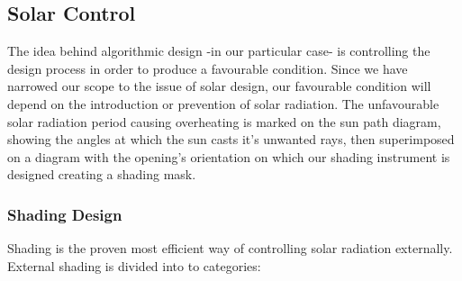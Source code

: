 \subsection{Solar Control}
The idea behind algorithmic design -in our particular case- is controlling the design process in order to produce a favourable condition. Since we have narrowed our scope to the issue of solar design, our favourable condition will depend on the introduction or prevention of solar radiation.  The unfavourable solar radiation period causing overheating is marked on the sun path diagram, showing the angles at which the sun casts it's unwanted rays, then superimposed on a diagram with the opening's orientation on which our shading instrument is designed creating a shading mask.

\subsubsection{Shading Design}
\label{Shading}
Shading is the proven most efficient way of controlling solar radiation externally. External shading is divided into to categories:
